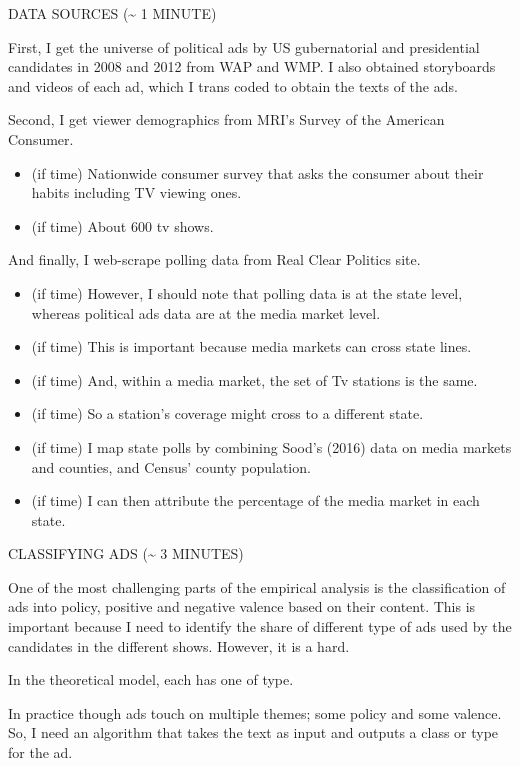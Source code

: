 \documentclass[12pt]{article}
\theoremstyle{plain}
\theoremstyle{plain}
\theoremstyle{plain}
\theoremstyle{plain}
\theoremstyle{plain}
\theoremstyle{plain}
\begin{document}
\item DATA SOURCES (\textasciitilde{} 1 MINUTE)
\label{sec:orgaaf28a4}


First, I get the universe of political ads by US gubernatorial and presidential candidates in 2008 and 2012 from WAP and WMP.
I also obtained storyboards and videos of each ad, which I trans coded to obtain the texts of the ads.

Second, I get viewer demographics from MRI's Survey of the American Consumer.
\begin{itemize}
\item (if time) Nationwide consumer survey that asks the consumer about their habits including TV viewing ones.
\item (if time) About 600 tv shows.
\end{itemize}

And finally, I web-scrape polling data from Real Clear Politics site.
\begin{itemize}
\item (if time) However, I should note that polling data is at the state level, whereas political ads data are at the media market level.
\item (if time) This is important because media markets can cross state lines.
\item (if time) And, within a media market, the set of Tv stations is the same.
\item (if time) So a station's coverage might cross to a different state.
\item (if time) I map state polls by combining Sood's (2016) data on media markets and counties, and Census' county population.
\item (if time) I can then attribute the percentage of the media market in each state.
\end{itemize}

\item CLASSIFYING ADS (\textasciitilde{} 3 MINUTES)
\label{sec:org7ba503a}

One of the most challenging parts of the empirical analysis is the classification of ads into policy, positive and negative valence based on their content.
This is important because I need to identify the share of different type of ads used by the candidates in the different shows.
However, it is a hard.

In the theoretical model, each has one of type.

In practice though ads touch on multiple themes; some policy and some valence.
So, I need an algorithm that takes the text as input and outputs a class or type for the ad.
\end{document}
